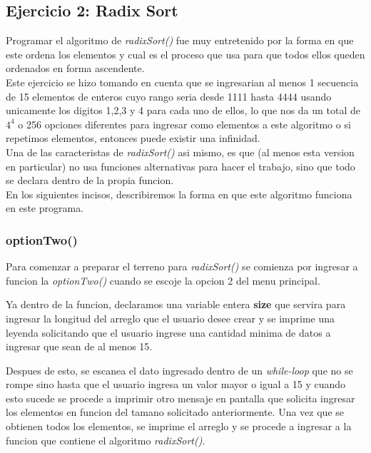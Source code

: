 \documentclass{article}
\begin{document}
		\subsection{Ejercicio 2: Radix Sort}
		
			Programar el algoritmo de \emph{radixSort()} fue muy entretenido por la forma en que este ordena los elementos y cual es el proceso que usa para que todos ellos queden ordenados en forma ascendente.\\
			
			Este ejercicio se hizo tomando en cuenta que se ingresarian al menos 1 secuencia de 15 elementos de enteros cuyo rango seria desde 1111 hasta 4444 usando unicamente los digitos 1,2,3 y 4 para cada uno de ellos, lo que nos da un total de $4^4$ o 256 opciones diferentes para ingresar como elementos a este algoritmo o si repetimos elementos, entonces puede existir una infinidad.\\
			
			Una de las caracteristas de \emph{radixSort()} asi mismo, es que (al menos esta version en particular) no usa funciones alternativas para hacer el trabajo, sino que todo se declara dentro de la propia funcion.\\
			
			En los siguientes incisos, describiremos la forma en que este algoritmo funciona en este programa.
		
			\subsubsection{optionTwo()}
			
				Para comenzar a preparar el terreno para \emph{radixSort()} se comienza por ingresar a funcion la \emph{optionTwo()} cuando se escoje la opcion 2 del menu principal.
				
				Ya dentro de la funcion, declaramos una variable entera \textbf{size} que servira para ingresar la longitud del arreglo que el usuario desee crear y se imprime una leyenda solicitando que el usuario ingrese una cantidad minima de datos a ingresar que sean de al menos 15.
				
				Despues de esto, se escanea el dato ingresado dentro de un \emph{while-loop} que no se rompe sino hasta que el usuario ingresa un valor mayor o igual a 15 y cuando esto sucede se procede a imprimir otro mensaje en pantalla que solicita ingresar los elementos en funcion del tamano solicitado anteriormente. Una vez que se obtienen todos los elementos, se imprime el arreglo y se procede a ingresar a la funcion que contiene el algoritmo \emph{radixSort()}.			
			
\end{document}
